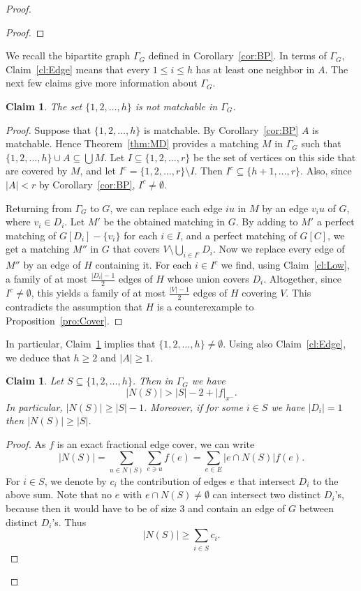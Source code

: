 \documentclass[10pt,a4paper]{amsart}
\newtheorem{claim}[theorem]{Claim}
\begin{document}
\begin{proof}
\begin{proof}
\end{proof}
We recall the bipartite graph $\Gamma_G$ defined in Corollary~\ref{cor:BP}. In terms of $\Gamma_G$, Claim~\ref{cl:Edge} means that every $1 \le i \le h$ has at least one neighbor in $A$. The next few claims give more information about $\Gamma_G$.
\begin{claim} \label{cl:No}
The set $\{1,2, \ldots , h\}$ is not matchable in $\Gamma_G$.
\end{claim}
\begin{proof} Suppose that $\{1,2, \ldots , h\}$ is matchable. By Corollary~\ref{cor:BP} $A$ is matchable. Hence Theorem~\ref{thm:MD} provides a matching $M$ in $\Gamma_G$ such that $\{1,2, \ldots , h\} \cup A \subseteq \bigcup M$. Let $I \subseteq \{1,2, \ldots , r\}$ be the set of vertices on this side that are covered by $M$, and let $I^c = \{1,2, \ldots , r\} \setminus I$. Then $I^c \subseteq \{h+1, \ldots , r\}$. Also, since $|A| < r$ by Corollary~\ref{cor:BP}, $I^c \ne \emptyset$.

Returning from $\Gamma_G$ to $G$, we can replace each edge $iu$ in $M$ by an edge $v_iu$ of $G$, where $v_i \in D_i$. Let $M'$ be the obtained matching in $G$. By adding to $M'$ a perfect matching of $G[D_i] - \{v_i\}$ for each $i \in I$, and a perfect matching of $G[C]$, we get a matching $M''$ in $G$ that covers $V \setminus \bigcup_{i \in I^c} D_i$. Now we replace every edge of $M''$ by an edge of $H$ containing it. For each $i \in I^c$ we find, using Claim~\ref{cl:Low}, a family of at most $\frac{|D_i|-1}{2}$ edges of $H$ whose union covers $D_i$. Altogether, since $I^c \ne \emptyset$, this yields a family of at most $\frac{|V|-1}{2}$ edges of $H$ covering $V$. This contradicts the assumption that $H$ is a counterexample to Proposition~\ref{pro:Cover}.
\end{proof}
In particular, Claim~\ref{cl:No} implies that $\{1,2, \ldots , h\} \ne \emptyset$. Using also Claim~\ref{cl:Edge}, we deduce that $h \ge 2$ and $|A| \ge 1$.
\begin{claim} \label{cl:SD}
Let $S \subseteq \{1,2, \ldots , h\}$. Then in $\Gamma_G$ we have \[ |N(S)| > |S| - 2 + |f|_{x^-}.\] In particular, $|N(S)| \ge |S| - 1$. Moreover, if for some $i \in S$ we have $|D_i| = 1$ then $|N(S)| \ge |S|$.
\end{claim}
\begin{proof} As $f$ is an exact fractional edge cover, we can write \[ |N(S)| = \sum_{u \in N(S)} \sum_{e \ni u} f(e) = \sum_{e \in E} |e \cap N(S)| f(e).\] For $i \in S$, we denote by $c_i$ the contribution of edges $e$ that intersect $D_i$ to the above sum. Note that no $e$ with $e \cap N(S) \ne \emptyset$ can intersect two distinct $D_i$'s, because then it would have to be of size $3$ and contain an edge of $G$ between distinct $D_i$'s. Thus
\begin{equation} \label{eq:nsci}
|N(S)| \ge \sum_{i \in S} c_i.
\end{equation}


\end{proof}
\end{proof}
\end{document}
